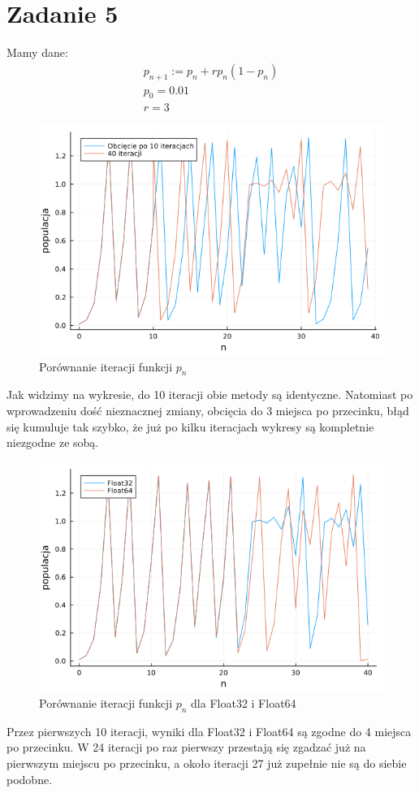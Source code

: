\documentclass{article}
\begin{document}
\section*{Zadanie 5}
Mamy dane:
\begin{gather*}
  p_{n+1}:=p_n+rp_n(1-p_n)\\
  p_0 = 0.01\\
  r=3
\end{gather*}
\begin{figure}[H]
  \centering
  \includegraphics[width=\textwidth]{../images/ex5.png}
  \caption{Porównanie iteracji funkcji $p_n$}
\end{figure}
Jak widzimy na wykresie, do 10 iteracji obie metody są
identyczne. Natomiast po wprowadzeniu dość nieznacznej
zmiany, obcięcia do 3 miejsca po przecinku,
błąd się kumuluje tak szybko, że już po kilku iteracjach
wykresy są kompletnie niezgodne ze sobą.
\begin{figure}[H]
  \centering
  \includegraphics[width=\textwidth]{../images/ex5_f32f64.png}
  \caption{Porównanie iteracji funkcji $p_n$ dla Float32 i Float64}
\end{figure}
Przez pierwszych 10 iteracji, wyniki dla Float32 i Float64
są zgodne do 4 miejsca po przecinku. W 24 iteracji po raz pierwszy
przestają się zgadzać już na pierwszym miejscu po przecinku, a
około iteracji 27 już zupełnie nie są do siebie podobne.
\end{document}
